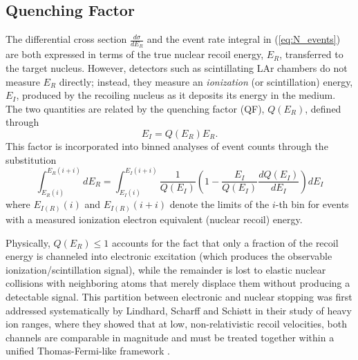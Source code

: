 \subsection{Quenching Factor}
The differential cross section $\frac{d\sigma}{dE_R}$ and the event rate integral in (\ref{eq:N_events}) are both expressed in terms of the true nuclear recoil energy, $E_R$, transferred to the target nucleus. However, detectors such as scintillating LAr chambers do not measure $E_R$ directly; instead, they measure an \textit{ionization} (or scintillation) energy, $E_I$, produced by the recoiling nucleus as it deposits its energy in the medium. The two quantities are related by the quenching factor (QF), $Q(E_R)$, defined through
\begin{equation}
    E_I = Q(E_R) E_R.
    \label{eq:QF_def}
\end{equation}
This factor is incorporated into binned analyses of event counts through the substitution~\cite{Fernandez_Moroni_2021}
\begin{equation}
    \int_{E_{R}(i)}^{E_{R}(i+i)}dE_R = \int_{E_{I}(i)}^{E_{I}(i+i)}\frac{1}{Q(E_I)}\left(1-\frac{E_I}{Q(E_I)}\frac{dQ(E_I)}{dE_I}\right)dE_I
\end{equation}
where $E_{I(R)}(i)$ and $E_{I(R)}(i+i)$ denote the limits of the $i$-th bin for events with a measured ionization electron equivalent (nuclear recoil) energy.

Physically, $Q(E_R) \leq 1$ accounts for the fact that only a fraction of the recoil energy is channeled into electronic excitation (which produces the observable ionization/scintillation signal), while the remainder is lost to elastic nuclear collisions with neighboring atoms that merely displace them without producing a detectable signal. This partition between electronic and nuclear stopping was first addressed systematically by Lindhard, Scharff and Schi\o tt in their study of heavy ion ranges, where they showed that at low, non-relativistic recoil velocities, both channels are comparable in magnitude and must be treated together within a unified Thomas-Fermi-like framework \cite{Lindhard1963}.

